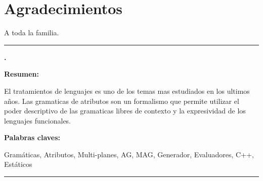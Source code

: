 \documentclass[a4paper,11pt,twoside]{ThesisStyle}
\begin{document}


\dominitoc


\cleardoublepage

\section*{Agradecimientos}

A toda la familia.

\tableofcontents

\mainmatter

% 
\appendix



% 
% 




\cleardoublepage

\begin{vcenterpage}

\noindent\rule[2pt]{\textwidth}{0.5pt}

{\centering\large\textbf{\maggen.\\}}

{\large\textbf{Resumen:}}

El tratamientos de lenguajes es uno de los temas mas estudiados en los ultimos años.
Las gramaticas de atributos son un formalismo que permite utilizar el poder descriptivo de las gramaticas libres de contexto y la expresividad de los lenguajes funcionales. 

{\large\textbf{Palabras claves:}}

Gramáticas, Atributos, Multi-planes, AG, MAG, Generador, Evaluadores, C++, Estáticos\\

\noindent\rule[2pt]{\textwidth}{0.5pt}

\end{vcenterpage}
\end{document}
